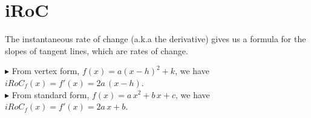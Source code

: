 \documentclass{ximera}
\begin{document}
\section{iRoC}


The instantaneous rate of change (a.k.a the derivative) gives us a formula for the slopes of tangent lines, which are rates of change.



\textbf{\textcolor{red!90!darkgray}{$\blacktriangleright$}} From vertex form, $f(x) = a (x -h)^2 + k$, we have $iRoC_f(x) = f'(x) = 2 a \, (x-h)$. \\



\textbf{\textcolor{red!90!darkgray}{$\blacktriangleright$}} From standard form, $f(x) = a \, x^2 + b \, x + c$, we have $iRoC_f(x) = f'(x) = 2 a \, x + b$. \\
\end{document}

